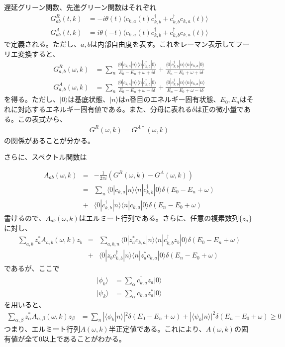 \documentclass[12pt]{jsbook}
\newcommand{\la}{\langle}
\newcommand{\ra}{\rangle}
\newcommand{\ca}{c_{k,a}}
\newcommand{\cad}{c_{k,a}^{\dagger}}
\newcommand{\cbd}{c_{k,b}^{\dagger}}
\begin{document}
遅延グリーン関数、先進グリーン関数はそれぞれ
\begin{eqnarray}
    G^R_{ab}(t,k) &= -i\theta(t)\langle c_{k,a}(t)c_{k,b}^{\dagger} + c_{k,b}^{\dagger}c_{k,a}(t)\rangle\\
G^A_{ab}(t,k) &= i\theta(-t)\langle c_{k,a}(t)c_{k,b}^{\dagger} + c_{k,b}^{\dagger}c_{k,a}(t)\rangle
\end{eqnarray}
で定義される。ただし、$a,b$は内部自由度を表す。これをレーマン表示してフーリエ変換すると、
\begin{eqnarray}
    G^R_{a,b}(\omega,k) &= \displaystyle \sum_n \frac{\la 0|\ca |n\ra \la n| \cbd | 0\ra}{E_0-E_n + \omega + i\delta } + \frac{\la 0|\cbd |n\ra \la n| \ca |0\ra}{E_n - E_0 + \omega + i\delta}\\
G^A_{a,b}(\omega,k) &= \displaystyle \sum_n \frac{\la 0|\ca |n\ra \la n | \cbd | 0\ra}{E_0-E_n + \omega -i\delta} + \frac{\la 0| \cbd |n \ra \la n | \ca | n\ra}{E_n - E_0 + \omega - i\delta}
\end{eqnarray}
を得る。ただし、$|0\ra$は基底状態、$|n\ra$は$n$番目のエネルギー固有状態、$E_0,E_n$はそれに対応するエネルギー固有値である。また、分母に表れる$\delta$は正の微小量である。この表式から、
\begin{eqnarray}
    G^R(\omega,k) = G^{A\dagger}(\omega,k)
\end{eqnarray}
の関係があることが分かる。

さらに、スペクトル関数は

\begin{eqnarray}
    A_{ab}(\omega,k)&=& -\frac{1}{2\pi i} (G^R(\omega,k)-G^A(\omega,k))\\
    &=&\displaystyle \sum_n \la 0|\ca|n\ra \la n|\cbd|0\ra \delta(E_0 - E_n + \omega) \\
    &+& \la 0|\cbd|n\ra\la n| \ca | 0\ra \delta (E_n-E_0 + \omega)
\end{eqnarray}
書けるので、$A_{ab}(\omega,k)$はエルミート行列である。さらに、任意の複素数列$\{z_a\}$に対し、
\begin{eqnarray}
    \displaystyle \sum_{a,b} z^*_a A_{a,b}(\omega,k)z_b &=& \displaystyle \sum_{a,b,n} \la 0|z^*_a \ca |n\ra\la n | \cbd z_b |0\ra \delta(E_0-E_n + \omega) \\
    &+&  \la 0|z_b \cbd|n\ra\la n| z_a^*\ca | 0\ra \delta (E_n-E_0 + \omega)
\end{eqnarray}
であるが、ここで
\begin{align}
|\phi_k\ra &= \displaystyle \sum_\alpha \cad z_a |0\ra\\ 
|\psi_k\ra &= \displaystyle \sum_\alpha \ca z_a^* |0\ra
\end{align}
を用いると、
\begin{align}
\displaystyle \sum_{\alpha,\beta} z^*_\alpha A_{\alpha,\beta}(\omega,k)z_\beta &= \displaystyle \sum_n |\la \phi_k|n\ra|^2 \delta(E_0 - E_n + \omega) + |\la \psi_k|n\ra |^2\delta(E_n-E_0 + \omega)\geq 0
\end{align}
つまり、エルミート行列$A(\omega,k)$半正定値である。これにより、$A(\omega,k)$の固有値が全て0以上であることがわかる。
\end{document}
